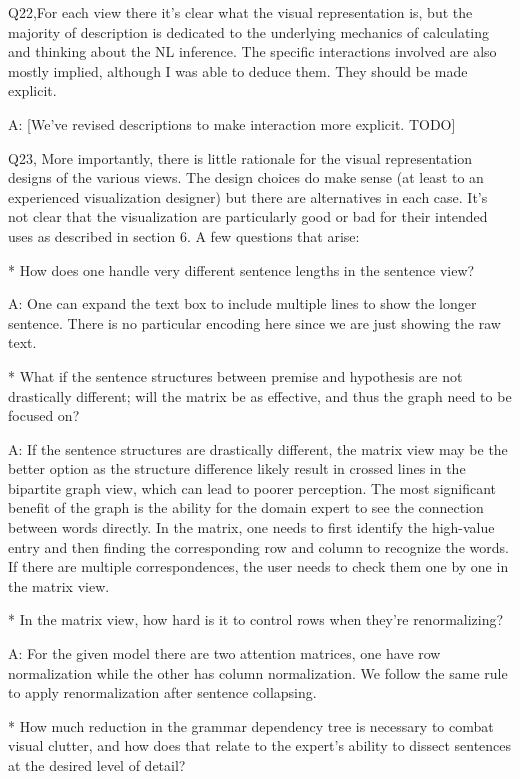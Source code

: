 Q22,For each view there it's clear what the visual representation is, but the majority of description is dedicated to the underlying mechanics of calculating and thinking about the NL inference. The specific interactions involved are also mostly implied, although I was able to deduce them. They should be made explicit.

A: [We've revised descriptions to make interaction more explicit. TODO]


Q23, More importantly, there is little rationale for the visual representation designs of the various views. The design choices do make sense (at least to an experienced visualization designer) but there are alternatives in each case. It's not clear that the visualization are particularly good or bad for their intended uses as described in section 6. A few questions that arise:

* How does one handle very different sentence lengths in the sentence view?

A: One can expand the text box to include multiple lines to show the longer sentence. There is no particular encoding here since we are just showing the raw text.

* What if the sentence structures between premise and hypothesis are not drastically different; will the matrix be as effective, and thus the graph need to be focused on?

A: If the sentence structures are drastically different, the matrix view may be the better option as the structure difference likely result in crossed lines in the bipartite graph view, which can lead to poorer perception. The most significant benefit of the graph is the ability for the domain expert to see the connection between words directly. In the matrix, one needs to first identify the high-value entry and then finding the corresponding row and column to recognize the words. If there are multiple correspondences, the user needs to check them one by one in the matrix view.

* In the matrix view, how hard is it to control rows when they're renormalizing?

A: For the given model there are two attention matrices, one have row normalization while the other has column normalization. We follow the same rule to apply renormalization after sentence collapsing.

* How much reduction in the grammar dependency tree is necessary to combat visual clutter, and how does that relate to the expert's ability to dissect sentences at the desired level of detail?

